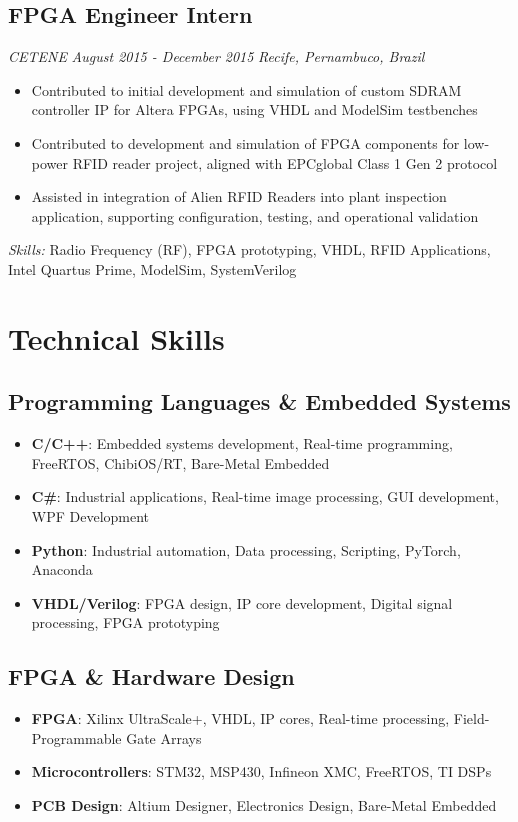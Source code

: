 \documentclass[11pt,a4paper]{article}
\begin{document}
\subsection{FPGA Engineer Intern}
\textit{CETENE} \hfill \textit{August 2015 - December 2015}
\textit{Recife, Pernambuco, Brazil}
\begin{itemize}
    \item Contributed to initial development and simulation of custom SDRAM controller IP for Altera FPGAs, using VHDL and ModelSim testbenches
    \item Contributed to development and simulation of FPGA components for low-power RFID reader project, aligned with EPCglobal Class 1 Gen 2 protocol
    \item Assisted in integration of Alien RFID Readers into plant inspection application, supporting configuration, testing, and operational validation
\end{itemize}
\textit{Skills:} Radio Frequency (RF), FPGA prototyping, VHDL, RFID Applications, Intel Quartus Prime, ModelSim, SystemVerilog

\section{Technical Skills}

\subsection{Programming Languages \& Embedded Systems}
\begin{itemize}
    \item \textbf{C/C++}: Embedded systems development, Real-time programming, FreeRTOS, ChibiOS/RT, Bare-Metal Embedded
    \item \textbf{C\#}: Industrial applications, Real-time image processing, GUI development, WPF Development
    \item \textbf{Python}: Industrial automation, Data processing, Scripting, PyTorch, Anaconda
    \item \textbf{VHDL/Verilog}: FPGA design, IP core development, Digital signal processing, FPGA prototyping
\end{itemize}

\subsection{FPGA \& Hardware Design}
\begin{itemize}
    \item \textbf{FPGA}: Xilinx UltraScale+, VHDL, IP cores, Real-time processing, Field-Programmable Gate Arrays
    \item \textbf{Microcontrollers}: STM32, MSP430, Infineon XMC, FreeRTOS, TI DSPs
    \item \textbf{PCB Design}: Altium Designer, Electronics Design, Bare-Metal Embedded
\end{itemize}
\end{document}
